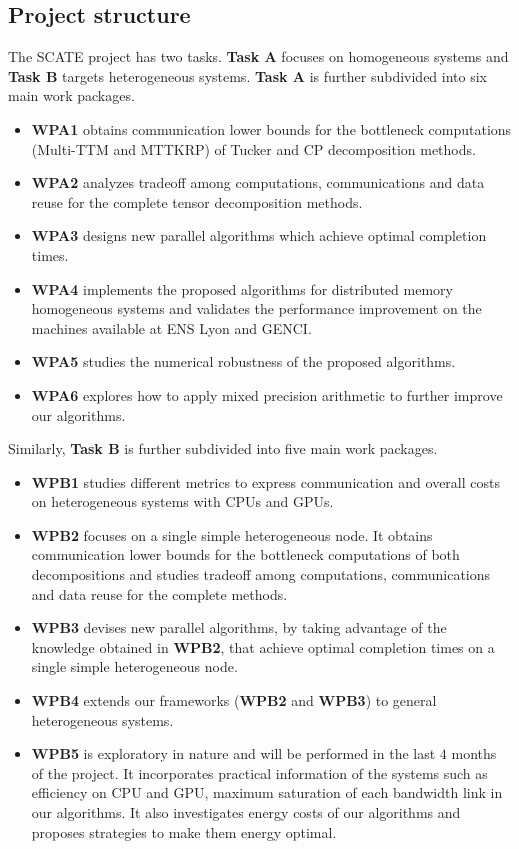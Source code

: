 \documentclass[a4paper,11pt]{article}
\begin{document}
	\subsection{Project structure}
	\label{sec:org:projstructure}
	The SCATE project has two tasks. \textbf{Task A} focuses on homogeneous systems and \textbf{Task B} targets heterogeneous systems. \textbf{Task A} is further subdivided into six main work packages.
	\begin{itemize}
		\item \textbf{WPA1} obtains communication lower bounds for the bottleneck computations (Multi-TTM and MTTKRP) of Tucker and CP decomposition methods.
		\item \textbf{WPA2} analyzes tradeoff among computations, communications and data reuse for the complete tensor decomposition methods.
		\item \textbf{WPA3} designs new parallel algorithms which achieve optimal completion times.
		\item \textbf{WPA4} implements the proposed algorithms for distributed memory homogeneous systems and validates the performance improvement on the machines available at ENS Lyon and GENCI.
		\item \textbf{WPA5} studies the numerical robustness of the proposed algorithms.
		\item \textbf{WPA6} explores how to apply mixed precision arithmetic to further improve our algorithms.
	\end{itemize}
	
	
	Similarly, \textbf{Task B} is further subdivided into five main work packages.
	\begin{itemize}
		\item \textbf{WPB1} studies different metrics to express communication and overall costs on heterogeneous systems with CPUs and GPUs.
		\item \textbf{WPB2} focuses on a single simple heterogeneous node. It obtains communication lower bounds for the bottleneck computations of both decompositions and studies tradeoff among computations, communications and data reuse for the complete methods.
		\item \textbf{WPB3} devises new parallel algorithms, by taking advantage of the knowledge obtained in \textbf{WPB2}, that achieve optimal completion times on a single simple heterogeneous node.
		\item \textbf{WPB4} extends our frameworks (\textbf{WPB2} and \textbf{WPB3}) to general heterogeneous systems.
		\item \textbf{WPB5} is exploratory in nature and will be performed in the last $4$ months of the project. It incorporates practical information of the systems such as efficiency on CPU and GPU, maximum saturation of each bandwidth link in our algorithms. It also investigates energy costs of our algorithms and proposes strategies to make them energy optimal.
	\end{itemize}
	
\end{document}
